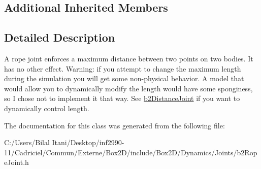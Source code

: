 \subsection*{Additional Inherited Members}


\subsection{Detailed Description}
A rope joint enforces a maximum distance between two points on two bodies. It has no other effect. Warning\+: if you attempt to change the maximum length during the simulation you will get some non-\/physical behavior. A model that would allow you to dynamically modify the length would have some sponginess, so I chose not to implement it that way. See \hyperlink{classb2_distance_joint}{b2\+Distance\+Joint} if you want to dynamically control length. 

The documentation for this class was generated from the following file\+:\begin{DoxyCompactItemize}
\item 
C\+:/\+Users/\+Bilal Itani/\+Desktop/inf2990-\/11/\+Cadriciel/\+Commun/\+Externe/\+Box2\+D/include/\+Box2\+D/\+Dynamics/\+Joints/b2\+Rope\+Joint.\+h\end{DoxyCompactItemize}
